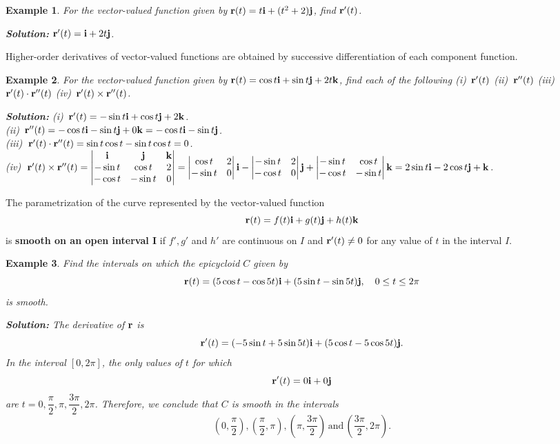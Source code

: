 \documentclass[titlepage,a4paper,12pt]{report}
\newtheorem{example}{Example}[section]
\begin{document}
\begin{example}
For the vector-valued function given by ${\bf{r}}(t)=t{\bf{i}}+(t^2+2){\bf{j}}$, find ${\bf{r}}'(t)$.

\noindent \textbf{Solution:} ${\bf{r}}'(t)={\bf{i}}+2t{\bf{j}}$.
\end{example}
\noindent Higher-order derivatives of vector-valued functions are obtained by successive differentiation of each component function.
\begin{example}
For the vector-valued function given by ${\bf{r}}(t)=\cos t{\bf{i}}+\sin t {\bf{j}}+2t{\bf{k}}$, find each of the following (i)\, ${\bf{r}}'(t)$ \quad (ii)\, ${\bf {r}}''(t)$ \quad (iii)\, ${\bf{r}}'(t) \cdot {\bf {r}}''(t) $ \quad (iv)\, ${\bf{r}}'(t) \times {\bf {r}}''(t) $.

\noindent \textbf{Solution:} (i)\, ${\bf{r}}'(t)=-\sin t {\bf{i}}+\cos t {\bf{j}} +2{\bf{k}}$.\\
(ii)\, ${\bf{r}}''(t)=-\cos t {\bf{i}}-\sin  t {\bf{j}} +0{\bf{k}}=-\cos t {\bf{i}}-\sin  t {\bf{j}}$.\\
(iii)\, ${\bf{r}}'(t) \cdot {\bf {r}}''(t) =\sin t \cos t-\sin t \cos t =0 $.\\
(iv)\, ${\bf{r}}'(t) \times {\bf {r}}''(t) =\begin{vmatrix}
{\bf{i}} & {\bf{j}} & {\bf{k}} \\
-\sin t & \cos t & 2 \\
-\cos t & -\sin t & 0
\end{vmatrix} =\begin{vmatrix}
\cos t & 2 \\
-\sin t & 0
\end{vmatrix} {\bf{i}}-\begin{vmatrix}
-\sin t & 2 \\
-\cos t & 0
\end{vmatrix} {\bf{j}} +\begin{vmatrix}
-\sin t & \cos t \\
-\cos t & -\sin t
\end{vmatrix} {\bf{k}} \\ =2\sin t {\bf{i}}-2\cos t {\bf{j}} +{\bf{k}}$. 
\end{example}
\noindent The parametrization of the curve represented by the vector-valued function 
\[{\bf{r}}(t)=f(t){\bf{i}}+g(t){\bf{j}}+h(t){\bf{k}}\] is \textbf{smooth on an open interval I} if $f', g'$ and $h'$ are continuous on $I$ and ${\bf{r}}'(t)\neq 0$ for any value of $t$ in the interval $I$.
\begin{example}
Find the intervals on which the epicycloid $C$ given by 
\[{\bf{r}}(t)=(5\cos t -\cos 5t){\bf{i}}+(5\sin t -\sin 5t){\bf{j}}, \quad 0\leq t\leq 2\pi\] is smooth.

\noindent \textbf{Solution:} The derivative of ${\bf{r}}$ is 
\[{\bf{r}}'(t)=(-5\sin t +5\sin 5t){\bf{i}}+(5\cos t -5\cos 5t){\bf{j}}.\]
In the interval $[0,2\pi]$, the only values of $t$ for which 
\[{\bf{r}}'(t)=0{\bf{i}}+0{\bf{j}}\] are $t=0, \dfrac{\pi}{2}, \pi, \dfrac{3\pi}{2}, 2\pi$. Therefore, we conclude that $C$ is smooth in the intervals
\[\left(0, \dfrac{\pi}{2}\right), \left(\dfrac{\pi}{2}, \pi\right), \left(\pi, \dfrac{3\pi}{2}\right)\, \mbox{and}\, \left(\dfrac{3\pi}{2}, 2\pi\right).\]
\end{example}
\end{document}
